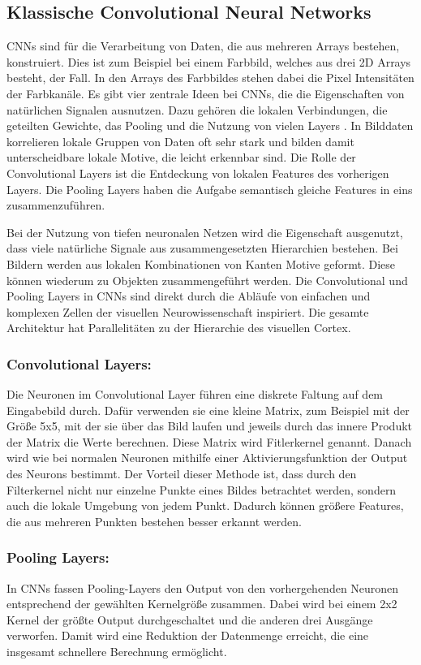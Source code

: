\documentclass[runningheads,a4paper]{llncs}[2015/06/24]
\begin{document}
\subsection{Klassische Convolutional Neural Networks}
CNNs sind für die Verarbeitung von Daten, die aus mehreren Arrays bestehen, konstruiert. Dies ist zum Beispiel bei einem Farbbild, welches aus drei 2D Arrays besteht, der Fall. In den Arrays des Farbbildes stehen dabei die Pixel Intensitäten der Farbkanäle. Es gibt vier zentrale Ideen bei CNNs, die die Eigenschaften von natürlichen Signalen ausnutzen. Dazu gehören die lokalen Verbindungen, die geteilten Gewichte, das Pooling und die Nutzung von vielen Layers \cite{lecun_nature}. In Bilddaten korrelieren lokale Gruppen von Daten oft sehr stark und bilden damit unterscheidbare lokale Motive, die leicht erkennbar sind. Die Rolle der Convolutional Layers ist die Entdeckung von lokalen Features des vorherigen Layers. Die Pooling Layers haben die Aufgabe semantisch gleiche Features in eins zusammenzuführen.

Bei der Nutzung von tiefen neuronalen Netzen wird die Eigenschaft ausgenutzt, dass viele natürliche Signale aus zusammengesetzten Hierarchien bestehen. Bei Bildern werden aus lokalen Kombinationen von Kanten Motive geformt. Diese können wiederum zu Objekten zusammengeführt werden. Die Convolutional und Pooling Layers in CNNs sind direkt durch die Abläufe von einfachen und komplexen Zellen der visuellen Neurowissenschaft inspiriert. Die gesamte Architektur hat Parallelitäten zu der Hierarchie des visuellen Cortex. 

\subsubsection*{Convolutional Layers:}
Die Neuronen im Convolutional Layer führen eine diskrete Faltung auf dem Eingabebild durch. Dafür verwenden sie eine kleine Matrix, zum Beispiel mit der Größe 5x5, mit der sie über das Bild laufen und jeweils durch das innere Produkt der Matrix die Werte berechnen. Diese Matrix wird Fitlerkernel genannt. Danach wird wie bei normalen Neuronen mithilfe einer Aktivierungsfunktion der Output des Neurons bestimmt. Der Vorteil dieser Methode ist, dass durch den Filterkernel nicht nur einzelne Punkte eines Bildes betrachtet werden, sondern auch die lokale Umgebung von jedem Punkt. Dadurch können größere Features, die aus mehreren Punkten bestehen besser erkannt werden.

\subsubsection*{Pooling Layers:}
In CNNs fassen Pooling-Layers den Output von den vorhergehenden Neuronen entsprechend der gewählten Kernelgröße zusammen. Dabei wird bei einem 2x2 Kernel der größte Output durchgeschaltet und die anderen drei Ausgänge verworfen. Damit wird eine Reduktion der Datenmenge erreicht, die eine insgesamt schnellere Berechnung ermöglicht.
\end{document}
